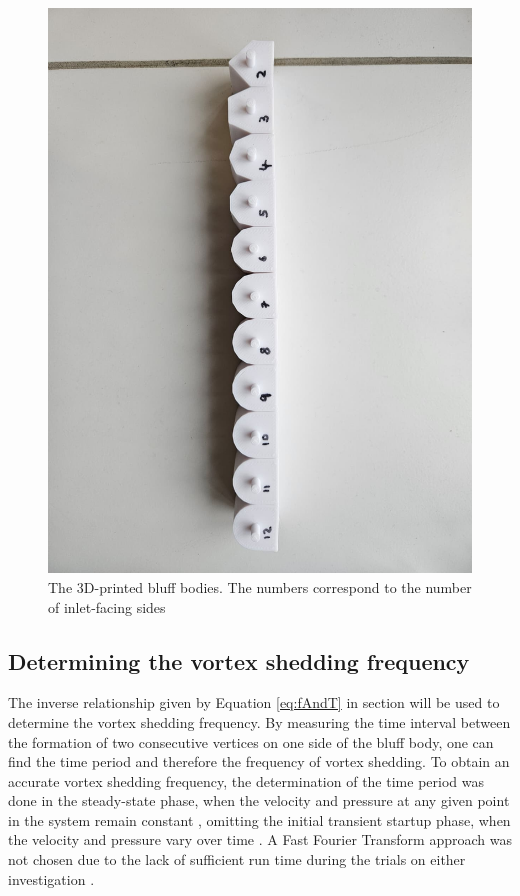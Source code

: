 \begin{figure}[H]
	\centering
	\includegraphics[width=\textwidth]{images/shapes.jpg}
	\caption{The 3D-printed bluff bodies. The numbers correspond to the number of inlet-facing sides}
	\label{fig:shapes}
\end{figure}


\subsection{Determining the vortex shedding frequency}
The inverse relationship given by Equation \eqref{eq:fAndT} in section  will be used to determine the vortex shedding frequency. By measuring the time interval between the formation of two consecutive vertices on one side of the bluff body, one can find the time period and therefore the frequency of vortex shedding. To obtain an accurate vortex shedding frequency, the determination of the time period was done in the steady-state phase, when the velocity and pressure at any given point in the system remain constant \parencite{noauthor_steady_nodate}, omitting the initial transient startup phase, when the velocity and pressure vary over time \parencite{noauthor_transient_nodate}. A Fast Fourier Transform approach was not chosen due to the lack of sufficient run time during the trials on either investigation \parencites[10--11]{shi2025vortex}[12]{xu_experimental_2025}.


